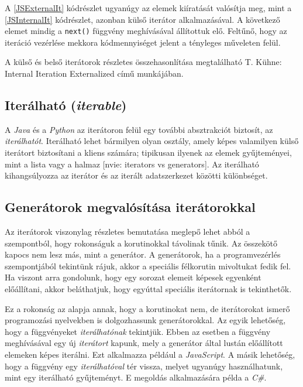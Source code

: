 A \ref{JSExternalIt} kódrészlet ugyanúgy az elemek kiíratását valósítja meg, mint a \ref{JSInternalIt} kódrészlet, azonban külső iterátor alkalmazásával. A következő elemet mindig a \texttt{next()} függvény meghívásával állítottuk elő. Feltűnő, hogy az iteráció vezérlése mekkora kódmennyiséget jelent a tényleges műveleten felül.

A külső és belső iterátorok részletes összehasonlítása megtalálható T. Kühne: Internal Iteration Externalized című munkájában.

\subsection{Iterálható (\textit{iterable})}

A \textit{Java} és a \textit{Python} az iterátoron felül egy további absztrakciót biztosít, az \textit{iterálhatót}. Iterálható lehet bármilyen olyan osztály, amely képes valamilyen külső iterátort biztosítani a kliens számára; tipikusan ilyenek az elemek gyűjteményei, mint a lista vagy a halmaz [nvie: iterators vs generators]. Az iterálható kihangsúlyozza az iterátor és az iterált adatszerkezet közötti különbséget.

\subsection{Generátorok megvalósítása iterátorokkal}

Az iterátorok viszonylag részletes bemutatása meglepő lehet abból a szempontból, hogy rokonságuk a korutinokkal távolinak tűnik. Az összekötő kapocs nem lesz más, mint a generátor. A generátorok, ha a programvezérlés szempontjából tekintünk rájuk, akkor a speciális félkorutin mivoltukat fedik fel. Ha viszont arra gondolunk, hogy egy sorozat elemeit képesek egyenként előállítani, akkor beláthatjuk, hogy egyúttal speciális iterátornak is tekinthetők.

Ez a rokonság az alapja annak, hogy a korutinokat nem, de iterátorokat ismerő programozási nyelvekben is dolgozhassunk generátorokkal. Az egyik lehetőség, hogy a függvényeket \textit{iterálhatónak} tekintjük. Ebben az esetben a függvény meghívásával egy új \textit{iterátort} kapunk, mely a generátor által lustán előállított elemeken képes iterálni. Ezt alkalmazza például a \textit{JavaScript}. A másik lehetőség, hogy a függvény egy \textit{iterálhatóval} tér vissza, melyet ugyanúgy használhatunk, mint egy iterálható gyűjteményt. E megoldás alkalmazására példa a \textit{C\#}.

